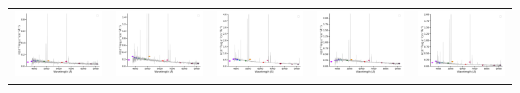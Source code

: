 \begin{center}
\begin{longtable}{l l l l l }
    \includegraphics[width=0.19\linewidth, clip]{Figs/Figs-sdss/spec-0378-52146-0223-STRIPE82-0145-047131.pdf} & \includegraphics[width=0.19\linewidth, clip]{Figs/Figs-sdss/spec-0389-51795-0544-STRIPE82-0008-021736.pdf} & \includegraphics[width=0.19\linewidth, clip]{Figs/Figs-sdss/spec-0390-51900-0596-STRIPE82-0010-026778.pdf} & \includegraphics[width=0.19\linewidth, clip]{Figs/Figs-sdss/spec-0391-51782-0125-STRIPE82-0011-016278.pdf} & \includegraphics[width=0.19\linewidth, clip]{Figs/Figs-sdss/spec-0391-51782-0394-STRIPE82-0010-016724.pdf} \\

\end{longtable}
\end{center}

